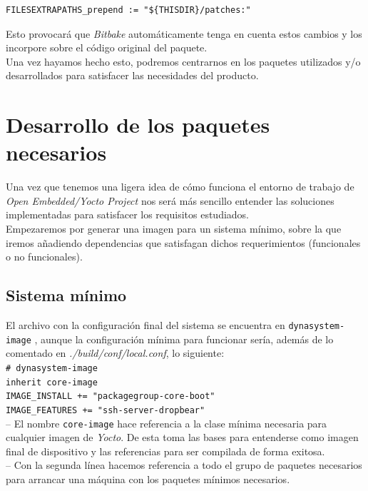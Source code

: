 \begin{lstlisting}
FILESEXTRAPATHS_prepend := "${THISDIR}/patches:"
\end{lstlisting}

Esto provocará que \textit{Bitbake} automáticamente tenga en cuenta estos cambios y los incorpore sobre el código original del paquete.\\

Una vez hayamos hecho esto, podremos centrarnos en los paquetes utilizados y/o desarrollados para satisfacer las necesidades del producto.

\section{Desarrollo de los paquetes necesarios}

Una vez que tenemos una ligera idea de cómo funciona el entorno de trabajo de \textit{Open Embedded/Yocto Project} nos será más sencillo entender las soluciones implementadas para satisfacer los requisitos estudiados.\\

Empezaremos por generar una imagen para un sistema mínimo, sobre la que iremos añadiendo dependencias que satisfagan dichos requerimientos (funcionales o no funcionales).

\subsection{Sistema mínimo}

El archivo con la configuración final del sistema se encuentra en \texttt{dynasystem-image} \cite{dynasystem-image}, aunque la configuración mínima para funcionar sería, además de lo comentado en \textit{./build/conf/local.conf}, lo siguiente:\\

\texttt{\# dynasystem-image\\
inherit core-image\\
IMAGE\_INSTALL += "packagegroup-core-boot"\\
IMAGE\_FEATURES += "ssh-server-dropbear"}\\

-- El nombre \texttt{core-image} hace referencia a la clase mínima necesaria para cualquier imagen de \textit{Yocto}. De esta toma las bases para entenderse como imagen final de dispositivo y las referencias para ser compilada de forma exitosa.\\

-- Con la segunda línea hacemos referencia a todo el grupo de paquetes necesarios para arrancar una máquina con los paquetes mínimos necesarios.\\

